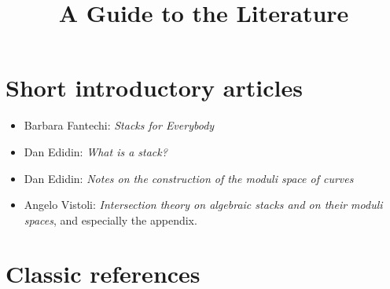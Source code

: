 

%


\title{A Guide to the Literature}

\maketitle

\label{section-phantom}

\tableofcontents

\section{Short introductory articles}
\label{section-short-introductions}


\begin{itemize}
\item Barbara Fantechi: \emph{Stacks for Everybody} \cite{fantechi_stacks}
\item Dan Edidin: \emph{What is a stack?} \cite{edidin_whatis}
\item Dan Edidin: \emph{Notes on the construction of the moduli space of
curves} \cite{edidin_notes}
\item Angelo Vistoli: \emph{Intersection theory on algebraic
stacks and on their moduli spaces}, and especially the appendix.
\cite{vistoli_intersection}
\end{itemize}


\section{Classic references}
\label{section-classics}

